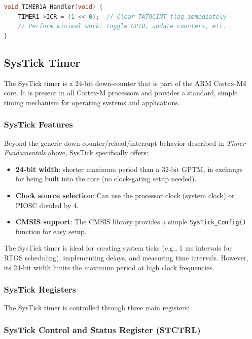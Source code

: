 \begin{lstlisting}[language=C]
void TIMER1A_Handler(void) {
    TIMER1->ICR = (1 << 0);  // Clear TATOCINT flag immediately
    // Perform minimal work: toggle GPIO, update counters, etc.
}
\end{lstlisting}
\subsection{SysTick Timer}

The SysTick timer is a 24-bit down-counter that is part of the ARM Cortex-M4 core. It is present in all Cortex-M processors and provides a standard, simple timing mechanism for operating systems and applications.

\subsubsection{SysTick Features}

Beyond the generic down-counter/reload/interrupt behavior described in \textit{Timer Fundamentals} above, SysTick specifically offers:
\begin{itemize}[nosep]
  \item \textbf{24-bit width}: shorter maximum period than a 32-bit GPTM, in exchange for being built into the core (no clock-gating setup needed).
  \item \textbf{Clock source selection}: Can use the processor clock (system clock) or PIOSC divided by 4.
  \item \textbf{CMSIS support}: The CMSIS library provides a simple \texttt{SysTick\_Config()} function for easy setup.
\end{itemize}

\noindent
The SysTick timer is ideal for creating system ticks (e.g., 1 ms intervals for RTOS scheduling), implementing delays, and measuring time intervals. However, its 24-bit width limits the maximum period at high clock frequencies.

\subsubsection{SysTick Registers}

The SysTick timer is controlled through three main registers:
\bigskip

\subsubsection*{SysTick Control and Status Register (STCTRL)}

